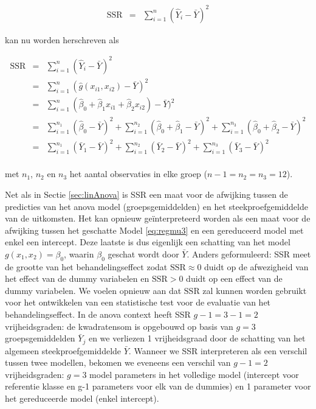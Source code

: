 \documentclass[12pt,dutch,coursenotes]{book}
\theoremstyle{definition}
\theoremstyle{definition}
\theoremstyle{definition}
\theoremstyle{remark}
\begin{document}
\begin{eqnarray*}
\text{SSR}&=&\sum\limits_{i=1}^n (\hat Y_{i} -\bar Y)^2
\end{eqnarray*}

kan nu worden herschreven als

\begin{eqnarray*}
\text{SSR}&=&\sum\limits_{i=1}^n (\hat Y_i -\bar Y)^2\\
&=& \sum\limits_{i=1}^n (\hat{g} (x_{i1},x_{i2}) - \bar Y)^2\\
&=& \sum\limits_{i=1}^n (\hat\beta_0+\hat\beta_1x_{i1}+\hat\beta_2x_{i2}) - \bar Y)^2\\
&=& \sum\limits_{i=1}^{n_1} (\hat\beta_0 - \bar Y)^2 +\sum\limits_{i=1}^{n_2} (\hat\beta_0 + \hat\beta_1 - \bar Y)^2+\sum\limits_{i=1}^{n_3} (\hat\beta_0 + \hat\beta_2 - \bar Y)^2\\
&=& \sum\limits_{i=1}^{n_1} (\bar Y_1- \bar Y)^2 +\sum\limits_{i=1}^{n_2} (\bar Y_2- \bar Y)^2+\sum\limits_{i=1}^{n_3} (\bar Y_3 - \bar Y)^2\\
\end{eqnarray*}

met \(n_1\), \(n_2\) en \(n_3\) het aantal observaties in elke groep
(\(n-1=n_2=n_3=12\)).

Net als in Sectie \ref{sec:linAnova} is SSR een maat voor de afwijking
tussen de predicties van het anova model (groepsgemiddelden) en het
steekproefgemiddelde van de uitkomsten. Het kan opnieuw geïnterpreteerd
worden als een maat voor de afwijking tussen het geschatte Model
\eqref{eq:regmu3} en een gereduceerd model met enkel een intercept. Deze
laatste is dus eigenlijk een schatting van het model
\(g(x_1,x_2)=\beta_0\), waarin \(\beta_0\) geschat wordt door
\(\bar{Y}\). Anders geformuleerd: SSR meet de grootte van het
behandelingseffect zodat \(\text{SSR} \approx 0\) duidt op de
afwezigheid van het effect van de dummy variabelen en \(\text{SSR}>0\)
duidt op een effect van de dummy variabelen. We voelen opnieuw aan dat
\(\text{SSR}\) zal kunnen worden gebruikt voor het ontwikkelen van een
statistische test voor de evaluatie van het behandelingseffect. In de
anova context heeft SSR \(g-1=3-1=2\) vrijheidsgraden: de kwadratensom
is opgebouwd op basis van \(g=3\) groepsgemiddelden \(\bar Y_j\) en we
verliezen 1 vrijheidsgraad door de schatting van het algemeen
steekproefgemiddelde \(\bar Y\). Wanneer we SSR interpreteren als een
verschil tussen twee modellen, bekomen we eveneens een verschil van
\(g-1=2\) vrijheidsgraden: \(g=3\) model parameters in het volledige
model (intercept voor referentie klasse en g-1 parameters voor elk van
de dummies) en 1 parameter voor het gereduceerde model (enkel
intercept).
\end{document}
